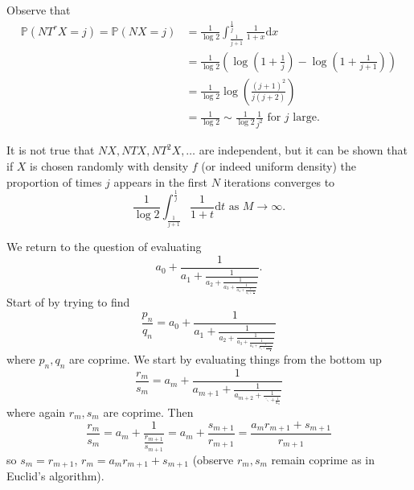 \documentclass[a4paper, 10pt, twocolumn]{amsart}
\theoremstyle{definition}
\newcommand{\bb}[1]{\mathbb{#1}}
\newcommand{\1}{\mathbbm{1}}
\begin{document}
Observe that \begin{align*}
    \bb{P}(NT^r X = j) = \bb{P}(NX=j) &= \frac{1}{\log{2}} \int_{\frac{1}{j+1}}^{\frac{1}{j}} \frac{1}{1+x} \mathrm{d}x  \\
    &= \frac{1}{\log{2}}\left( \log\left(1+\frac{1}{j}\right)-\log\left(1+\frac{1}{j+1}\right)\right)\\
    &= \frac{1}{\log{2}} \log\left(\frac{(j+1)^2}{j(j+2)}\right)\\
    &= \frac{1}{\log{2}} \sim \frac{1}{\log{2}} \frac{1}{j^2}\text{ for }j\text{ large}.
\end{align*}

It is not true that $NX,NTX,NT^2X,\ldots$ are independent, but it can be shown that if $X$ is chosen randomly with density $f$ (or indeed uniform density) the proportion of times $j$ appears in the first $N$ iterations converges to \[\frac{1}{\log{2}} \int_{\frac{1}{j+1}}^{\frac{1}{j}} \frac{1}{1+t}\mathrm{d}t \text{ as } M \to \infty.\]

We return to the question of evaluating \[a_0+\frac{1}{a_1+\frac{1}{a_2+\frac{1}{a_3+\frac{1}{a_4+\frac{1}{a_5+\frac{1}{\ddots}}}}}}.\]
Start of by trying to find \[\frac{p_n}{q_n} = a_0+\frac{1}{a_1+\frac{1}{a_2+\frac{1}{a_3+\frac{1}{a_4+\frac{1}{a_5+\frac{1}{\ddots \frac{1}{a_n}}}}}}}\]
where $p_n,q_n$ are coprime. We start by evaluating things from the bottom up \[\frac{r_m}{s_m} = a_m + \frac{1}{a_{m+1}+\frac{1}{a_{m+2}+\frac{1}{\ddots +\frac{1}{a_n}}}}\]
where again $r_m,s_m$ are coprime. Then \[\frac{r_m}{s_m} = a_m+\frac{1}{\frac{r_{m+1}}{s_{m+1}}} = a_m + \frac{s_{m+1}}{r_{m+1}} = \frac{a_mr_{m+1}+s_{m+1}}{r_{m+1}}\]
so $s_m = r_{m+1}$, $r_m = a_m r_{m+1} +s_{m+1}$ (observe $r_m,s_m$ remain coprime as in Euclid's algorithm).\\
\end{document}
